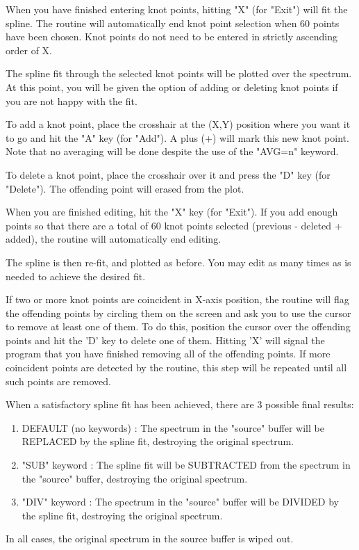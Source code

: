 When you have finished entering knot points, hitting "X" (for "Exit") will
fit the spline. The routine will automatically end knot point selection
when 60 points have been chosen.  Knot points do not need to be entered in
strictly ascending order of X.
 
The spline fit through the selected knot points will be plotted over the
spectrum.  At this point, you will be given the option of adding or
deleting knot points if you are not happy with the fit.
 
To add a knot point, place the crosshair at the (X,Y) position where you
want it to go and hit the "A" key (for "Add").  A plus (+) will mark this
new knot point.  Note that no averaging will be done despite the use of the
"AVG=n" keyword.
 
To delete a knot point, place the crosshair over it and press the "D" key
(for "Delete").  The offending point will erased from the plot.
 
When you are finished editing, hit the "X" key (for "Exit"). If you add
enough points so that there are a total of 60 knot points selected
(previous - deleted + added), the routine will automatically end editing.

The spline is then re-fit, and plotted as before.  You may edit as many
times as is needed to achieve the desired fit.

If two or more knot points are coincident in X-axis position, the routine
will flag the offending points by circling them on the screen and ask you
to use the cursor to remove at least one of them.  To do this, position the
cursor over the offending points and hit the 'D' key to delete one of
them. Hitting 'X' will signal the program that you have finished removing
all of the offending points.  If more coincident points are detected by the
routine, this step will be repeated until all such points are removed.
 
When a satisfactory spline fit has been achieved, there are 3 possible
final results:
\begin{enumerate} 
  \item{DEFAULT (no keywords) : The spectrum in the "source" buffer will be
       REPLACED by the spline fit, destroying the original spectrum.}

  \item{"SUB" keyword : The spline fit will be SUBTRACTED from the spectrum
       in the "source" buffer, destroying the original spectrum.}

  \item{"DIV" keyword : The spectrum in the "source" buffer will be DIVIDED
       by the spline fit, destroying the original spectrum.}
\end{enumerate}
In all cases, the original spectrum in the source buffer is wiped out.
 
